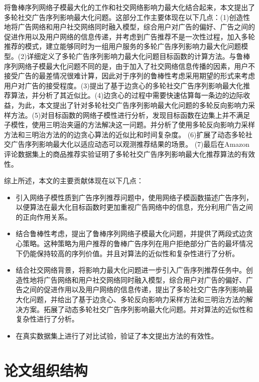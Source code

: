 将鲁棒序列网络子模最大化的工作和社交网络影响力最大化结合起来，本文提出了多轮社交广告序列影响最大化问题。这部分工作主要体现在以下几点：(1)创造性地将广告网络和用户社交网络同时融入模型，综合用户对广告的偏好、广告之间的促进作用以及用户网络的信息传递，并考虑到广告推荐不是一次性过程，加入多轮推荐的模式，建立能够同时为一组用户服务的多轮广告序列影响力最大化问题模型。(2)详细定义了多轮广告序列影响力最大化问题目标函数的计算方法。与鲁棒序列网络子模最大化问题不同的是，由于加入了社交网络信息传播的因素，用户不接受广告的最差情况很难计算，因此对于序列的鲁棒性考虑采用期望的形式来考虑用户对广告的接受程度。(3)提出了基于边贪心的多轮社交广告序列影响最大化推荐算法，并分析了其近似比。(4)边贪心的过程中需要快速估算每一条边的边际收益，为此，本文提出了针对多轮社交广告序列影响最大化问题的多轮反向影响力采样方法。(5)对目标函数的网络子模性进行分析，发现目标函数在边集上并不满足子模性，使用三明治夹逼的方法解决这一问题。并分析了使用多轮反向影响力采样方法和三明治方法的的边贪心算法的近似比和时间复杂度。
(6)扩展了动态多轮社交广告序列影响最大化以适应动态可以观测推荐结果的场景。
(7)最后在Amazon评论数据集\cite{amazon24}上的商品推荐实验证明了多轮社交广告序列影响最大化推荐算法的有效性。

综上所述，本文的主要贡献体现在以下几点：

\begin{itemize}
\item 引入网络子模性质到广告序列推荐问题中，使用网络子模函数描述广告序列，以便算法在最大化目标函数时更加重视广告网络中的信息，充分利用广告之间的正向作用关系。
\item 结合鲁棒性考虑，提出了鲁棒序列网络子模最大化问题，并提供了两段式边贪心策略。这种策略为用户推荐的鲁棒广告序列在用户拒绝部分广告的最坏情况下仍能保持较高的序列价值。并且对算法的近似性和复杂性进行了分析。
\item 结合社交网络背景，将影响力最大化问题进一步引入广告序列推荐任务中。创造性地将广告网络和用户社交网络同时融入模型，综合用户对广告的偏好、广告之间的促进作用以及用户网络的信息传递，提出了多轮社交广告序列影响最大化问题，并给出了基于边贪心、多轮反向影响力采样方法和三明治方法的解决方案。拓展了动态多轮社交广告序列影响最大化问题。并对算法的近似性和复杂性进行了分析。
\item 在真实数据集上进行了对比试验，验证了本文提出方法的有效性。
\end{itemize}


\section{论文组织结构}

